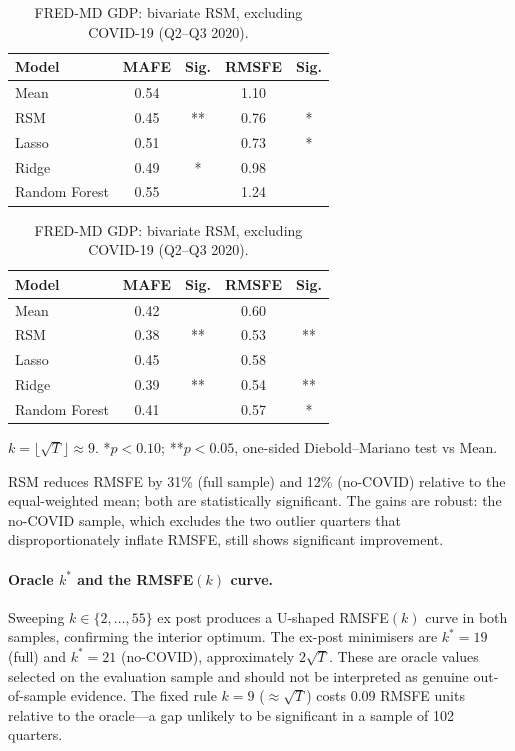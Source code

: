 \documentclass[12pt,a4paper]{article}
\theoremstyle{definition}
\begin{document}
\begin{table}[ht]
\centering
\caption{FRED-MD GDP: bivariate RSM, full sample (102 quarters).}
\label{tab:gdp_full}
\begin{tabular}{lcccc}
\toprule
Model & MAFE & Sig. & RMSFE & Sig. \\
\midrule
Mean           & 0.54 &    & 1.10 &   \\
RSM            & 0.45 & ** & 0.76 & * \\
Lasso          & 0.51 &    & 0.73 & * \\
Ridge          & 0.49 & *  & 0.98 &   \\
Random Forest  & 0.55 &    & 1.24 &   \\
\bottomrule
\end{tabular}

\medskip

\caption{FRED-MD GDP: bivariate RSM, excluding COVID-19 (Q2--Q3 2020).}
\label{tab:gdp_nocov}
\begin{tabular}{lcccc}
\toprule
Model & MAFE & Sig. & RMSFE & Sig. \\
\midrule
Mean           & 0.42 &    & 0.60 &    \\
RSM            & 0.38 & ** & 0.53 & ** \\
Lasso          & 0.45 &    & 0.58 &    \\
Ridge          & 0.39 & ** & 0.54 & ** \\
Random Forest  & 0.41 &    & 0.57 & *  \\
\bottomrule
\end{tabular}
\footnotesize{$k=\lfloor\sqrt{T}\rfloor\approx 9$.
*$p<0.10$; **$p<0.05$, one-sided Diebold--Mariano test vs Mean.}
\end{table}

RSM reduces RMSFE by 31\% (full sample) and 12\% (no-COVID) relative to
the equal-weighted mean; both are statistically significant.  The gains are
robust: the no-COVID sample, which excludes the two outlier quarters that
disproportionately inflate RMSFE, still shows significant improvement.

\paragraph{Oracle $k^*$ and the RMSFE$(k)$ curve.}
Sweeping $k\in\{2,\ldots,55\}$ ex post produces a U-shaped RMSFE$(k)$ curve
in both samples, confirming the interior optimum.  The ex-post minimisers
are $k^*=19$ (full) and $k^*=21$ (no-COVID), approximately $2\sqrt{T}$.
These are oracle values selected on the evaluation sample and should not be
interpreted as genuine out-of-sample evidence.  The fixed rule $k=9$
($\approx\sqrt{T}$) costs 0.09 RMSFE units relative to the oracle---a gap
unlikely to be significant in a sample of 102 quarters.
\end{document}
